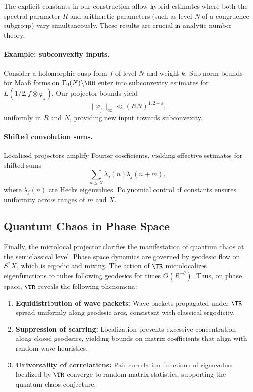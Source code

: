 The explicit constants in our construction allow hybrid estimates where both the spectral parameter $R$ and arithmetic parameters (such as level $N$ of a congruence subgroup) vary simultaneously. These results are crucial in analytic number theory.

\paragraph{Example: subconvexity inputs.}
Consider a holomorphic cusp form $f$ of level $N$ and weight $k$. Sup-norm bounds for Maaß forms on $\Gamma_0(N)\backslash \HH$ enter into subconvexity estimates for $L(1/2,f\otimes\varphi_j)$. Our projector bounds yield
\[
\|\varphi_j\|_\infty \ll (R N)^{1/2-\varepsilon},
\]
uniformly in $R$ and $N$, providing new input towards subconvexity.

\paragraph{Shifted convolution sums.}
Localized projectors amplify Fourier coefficients, yielding effective estimates for shifted sums
\[
\sum_{n\le X} \lambda_j(n)\lambda_j(n+m),
\]
where $\lambda_j(n)$ are Hecke eigenvalues. Polynomial control of constants ensures uniformity across ranges of $m$ and $X$.

\subsection{Quantum Chaos in Phase Space}\label{subsec:phasechaos}

Finally, the microlocal projector clarifies the manifestation of quantum chaos at the semiclassical level. Phase space dynamics are governed by geodesic flow on $S^*X$, which is ergodic and mixing. The action of $\TR$ microlocalizes eigenfunctions to tubes following geodesics for times $O(R^{-\theta})$. Thus, on phase space, $\TR$ reveals the following phenomena:
\begin{enumerate}
\item \textbf{Equidistribution of wave packets:} Wave packets propagated under $\TR$ spread uniformly along geodesic arcs, consistent with classical ergodicity.
\item \textbf{Suppression of scarring:} Localization prevents excessive concentration along closed geodesics, yielding bounds on matrix coefficients that align with random wave heuristics.
\item \textbf{Universality of correlations:} Pair correlation functions of eigenvalues localized by $\TR$ converge to random matrix statistics, supporting the quantum chaos conjecture.
\end{enumerate}

